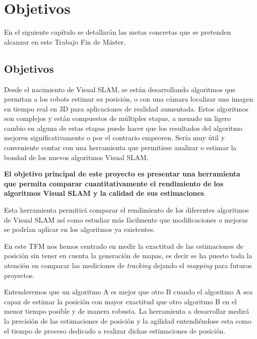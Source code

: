 \chapter{Objetivos} \label{cap:Objetivos}


En el siguiente capítulo se detallarán las metas concretas que se pretenden alcanzar en este Trabajo Fin de Máster.

\section{Objetivos}
Desde el nacimiento de Visual SLAM, se están desarrollando algoritmos que permitan a los robots estimar su posición, o con una cámara localizar una imagen en tiempo real en 3D para aplicaciones de realidad aumentada. Estos algoritmos son complejos y están compuestos de múltiples etapas, a menudo un ligero cambio en alguna de estas etapas puede hacer que los resultados del algoritmo mejoren significativamente o por el contrario empeoren. Sería muy útil y conveniente contar con una herramienta que permitiese analizar o estimar la bondad de los nuevos algoritmos Visual SLAM.

\textbf{El objetivo principal de este proyecto es presentar una herramienta que permita comparar cuantitativamente el rendimiento de los algoritmos Visual SLAM y la calidad de sus estimaciones}.

Esta herramienta permitirá comparar el rendimiento de los diferentes algoritmos de Visual SLAM así como estudiar más fácilmente que modificaciones o mejoras se podrían aplicar en los algoritmos ya existentes.

En  este TFM nos hemos centrado en medir la exactitud de las estimaciones de posición sin tener en cuenta la generación de mapas, es decir se ha puesto toda la atención en comparar las mediciones de \textit{tracking} dejando el \textit{mapping} para futuros proyectos. 

Entenderemos que un algoritmo A es mejor que otro B cuando el algoritmo A sea capaz de estimar la posición con mayor exactitud que otro algoritmo B en el menor tiempo posible y de manera robusta. La herramienta a desarrollar medirá la precisión de las estimaciones de posición y la agilidad entendiéndose esta como el tiempo de proceso dedicado a realizar dichas estimaciones de posición. 

